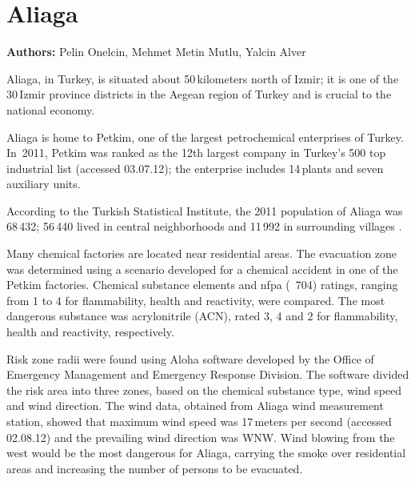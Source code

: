 \chapter{Aliaga}
\label{ch:aliaga}
\hfill \textbf{Authors:} Pelin Onelcin, Mehmet Metin Mutlu, Yalcin Alver


Aliaga, in Turkey, is situated about 50\,kilometers north of Izmir; it is one of the 30\,Izmir province districts in the Aegean region of Turkey and is crucial to the national economy. 
 
Aliaga is home to Petkim, one of the largest petrochemical enterprises of Turkey.
In~2011, Petkim was ranked as the 12th largest company in Turkey's 500 top industrial list \citep[][]{ICI_Webpage_2012}(accessed 03.07.12); the enterprise includes 14\,plants and seven auxiliary units. 

According to the Turkish Statistical Institute, the 2011 population of Aliaga was 68\,432; 56\,440 lived in central neighborhoods and 11\,992 in surrounding villages \citep[][]{TSI_Webpage_2011}.

Many chemical factories are located near residential areas. The evacuation zone was determined using a scenario developed for a chemical accident in one of the Petkim factories. Chemical substance elements and  \gls{nfpa} (~704) ratings, ranging from 1 to 4 for flammability, health and reactivity, were compared. The most dangerous substance was acrylonitrile (ACN), rated 3, 4 and 2 for flammability, health and reactivity, respectively.

Risk zone radii were found using Aloha software developed by the Office of Emergency Management and Emergency Response Division. The software divided the risk area into three zones, based on the chemical substance type, wind speed and wind direction. The wind data, obtained from Aliaga wind measurement station, showed that maximum wind speed was 17\,meters per second \citep[][]{Wolfram_Webpage_2012}(accessed 02.08.12) and the prevailing wind direction was WNW. Wind blowing from the west would be the most dangerous for Aliaga, carrying the smoke over residential areas and increasing the number of persons to be evacuated.

